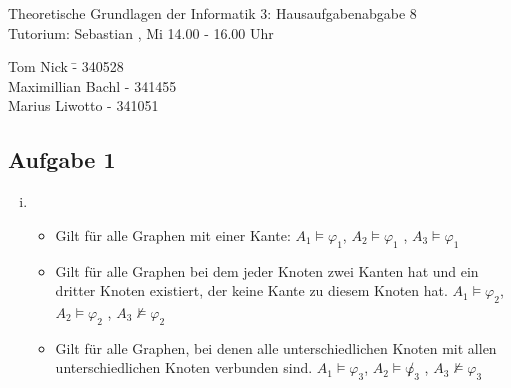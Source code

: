 \documentclass[a4paper,10pt]{article}
\begin{document}
\begin{center}
\Large{Theoretische Grundlagen der Informatik 3: Hausaufgabenabgabe 8} \\
\large{Tutorium: Sebastian , Mi 14.00 - 16.00 Uhr}
\end{center}
\begin{tabbing}
Tom Nick \hspace{2cm}\= - 340528\\
Maximillian Bachl \> - 341455 \\
Marius Liwotto\> -  341051
\end{tabbing}
\subsection{Aufgabe 1}
\begin{enumerate}[(i)]
	\item 
	\begin{itemize}
		\item 	Gilt für alle Graphen mit einer Kante: $A_1 \vDash \varphi_1$, $A_2 \vDash \varphi_1$ , $A_3 \vDash \varphi_1$
		\item 	Gilt für alle Graphen bei dem jeder Knoten zwei Kanten hat und ein dritter Knoten existiert, der keine Kante zu diesem Knoten hat.
			$A_1 \vDash \varphi_2$, $A_2 \vDash \varphi_2$ , $A_3 \not\vDash \varphi_2$
		\item  	Gilt für alle Graphen, bei denen alle unterschiedlichen Knoten mit allen unterschiedlichen Knoten verbunden sind.
			$A_1 \vDash \varphi_3$, $A_2 \vDash \not\varphi_3$ , $A_3 \not\vDash \varphi_3$
	\end{itemize}
	
\end{enumerate}
\end{document}
